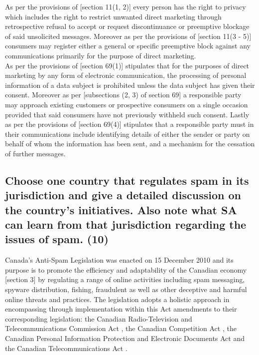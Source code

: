 \documentclass[11pt]{article}
\begin{document}
As per the provisions of [section 11(1, 2)]\cite{rsa08_cpa} every
person has the right to privacy which includes the right to restrict unwanted
direct marketing through retrospective refusal to accept or request
discontinuance or preemptive blockage of said unsolicited messages. Moreover as
per the provisions of [section 11(3 - 5)]\cite{rsa08_cpa}
consumers may register either a general or specific preemptive block against any
communications primarily for the purpose of direct marketing.\\

As per the provisions of [section 69(1)]\cite{rsa13_popi} stipulates that for the
purposes of direct marketing by any form of electronic communication, the
processing of personal information of a data subject is prohibited unless the
data subject has given their consent. Moreover as per [subsections (2, 3) of
section 69]\cite{rsa13_popi} a responsible party may approach existing customers
or prospective consumers on a single occasion provided that said consumers have
not previously withheld such consent. Lastly as per the provisions of [section
69(4)]\cite{rsa13_popi} stipulates that a responsible party must in their
communications include identifying details of either the sender or party on
behalf of whom the information has been sent, and a mechanism for the cessation
of further messages.

\subsection{Choose one country that regulates spam in its jurisdiction and give a detailed discussion on the country's initiatives. Also note what SA can learn from that jurisdiction regarding the issues of spam. (10)}
\label{sec:org9717a87}

Canada's Anti-Spam Legislation \cite{ca10_anti_spam_act} was enacted on 15
December 2010 and its purpose is to promote the efficiency and adaptability of
the Canadian economy [section 3]\cite{ca10_anti_spam_act} by regulating a range of
online activities including spam messaging, spyware distribution, fishing,
fraudulent as well as other deceptive and harmful online threats and practices.
The legislation adopts a holistic approach in encompassing through
implementation within this Act amendments to their corresponding legislation:
the Canadian Radio-Television and Telecommunications Commission Act
\cite{ca85_radio_tv_telecomms_act}, the Canadian Competition Act
\cite{ca85_comp_act}, the Canadian Personal Information Protection and Electronic
Documents Act \cite{ca00_popi_act} and the Canadian Telecommunications Act
\cite{ca93_telecomms_act}.\\
\end{document}
